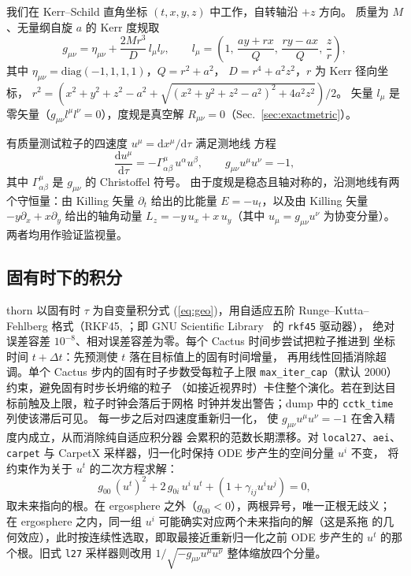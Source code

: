 \documentclass[11pt,UTF8]{ctexart}
\begin{document}
我们在 Kerr--Schild 直角坐标 $(t,x,y,z)$ 中工作，自转轴沿 $+z$ 方向。
质量为 $M$、无量纲自旋 $a$ 的 Kerr 度规取 \citep{kerrschild1965}
\begin{equation}
g_{\mu\nu} = \eta_{\mu\nu} + \frac{2Mr^3}{D}\,l_\mu l_\nu ,
\qquad
l_\mu = \left(1,\, \frac{a y + r x}{Q},\, \frac{r y - a x}{Q},\, \frac{z}{r}\right),
\label{eq:metric-form}
\end{equation}
其中 $\eta_{\mu\nu}=\mathrm{diag}(-1,1,1,1)$，$Q = r^2 + a^2$，
$D = r^4 + a^2z^2$，$r$ 为 Kerr 径向坐标，
$r^2 = (x^2+y^2+z^2-a^2 + \sqrt{(x^2+y^2+z^2-a^2)^2 + 4a^2z^2})/2$。
矢量 $l_\mu$ 是零矢量（$g_{\mu\nu}l^\mu l^\nu = 0$），度规是真空解
$R_{\mu\nu} = 0$（Sec.~\ref{sec:exactmetric}）。

有质量测试粒子的四速度 $u^\mu = \mathrm{d}x^\mu/\mathrm{d}\tau$ 满足测地线
方程
\begin{equation}
\frac{\mathrm{d}u^\mu}{\mathrm{d}\tau} =
-\Gamma^\mu_{\alpha\beta}\,u^\alpha u^\beta ,
\qquad
g_{\mu\nu}u^\mu u^\nu = -1 ,
\label{eq:geo}
\end{equation}
其中 $\Gamma^\mu_{\alpha\beta}$ 是 $g_{\mu\nu}$ 的 Christoffel 符号。
由于度规是稳态且轴对称的，沿测地线有两个守恒量：由 Killing 矢量
$\partial_t$ 给出的比能量 $E = -u_t$，以及由 Killing 矢量
$-y\partial_x + x\partial_y$ 给出的轴角动量
$L_z = -y\,u_x + x\,u_y$（其中 $u_\mu = g_{\mu\nu}u^\nu$ 为协变分量）。
两者均用作验证监视量。

\subsection{固有时下的积分}

thorn 以固有时 $\tau$ 为自变量积分式 (\ref{eq:geo})，用自适应五阶
Runge--Kutta--Fehlberg 格式（RKF45, \citealt{fehlberg1969}；即 GNU
Scientific Library~\citep{gsl} 的 \texttt{rkf45} 驱动器），
绝对误差容差 $10^{-8}$、相对误差容差为零。每个 Cactus 时间步尝试把粒子推进到
坐标时间 $t + \Delta t$：先预测使 $t$ 落在目标值上的固有时间增量，
再用线性回插消除超调。单个 Cactus 步内的固有时子步数受每粒子上限
\texttt{max\_iter\_cap}（默认 2000）约束，避免固有时步长坍缩的粒子
（如接近视界时）卡住整个演化。若在到达目标前触及上限，粒子时钟会落后于网格
时钟并发出警告；dump 中的 \texttt{cctk\_time} 列使该滞后可见。
每一步之后对四速度重新归一化，
使 $g_{\mu\nu}u^\mu u^\nu = -1$ 在舍入精度内成立，从而消除纯自适应积分器
会累积的范数长期漂移。对 \texttt{local27}、\texttt{aei}、\texttt{carpet}
与 CarpetX 采样器，归一化时保持 ODE 步产生的空间分量 $u^i$ 不变，
将约束作为关于 $u^t$ 的二次方程求解：
\begin{equation}
g_{00}\,(u^t)^2 + 2\,g_{0i}\,u^i\,u^t + \left(1 + \gamma_{ij}u^i u^j\right) = 0,
\label{eq:renorm}
\end{equation}
取未来指向的根。在 ergosphere 之外（$g_{00}<0$），两根异号，唯一正根无歧义；
在 ergosphere 之内，同一组 $u^i$ 可能确实对应两个未来指向的解（这是系拖
的几何效应），此时按连续性选取，即取最接近重新归一化之前 ODE 步产生的
$u^t$ 的那个根。旧式 \texttt{l27} 采样器则改用
$1/\sqrt{-g_{\mu\nu}u^\mu u^\nu}$ 整体缩放四个分量。
\end{document}
